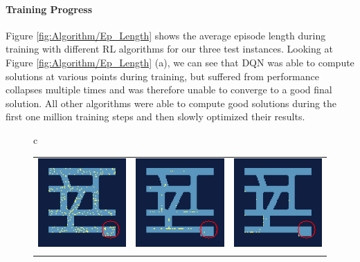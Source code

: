 \paragraph{Training Progress}
Figure \ref{fig:Algorithm/Ep_Length} shows the average episode length during training with different RL algorithms for our three test instances. Looking at Figure \ref{fig:Algorithm/Ep_Length} (a), we can see that DQN was able to compute solutions at various points during training, but suffered from performance collapses multiple times and was therefore unable to converge to a good final solution. All other algorithms were able to compute good solutions during the first one million training steps and then slowly optimized their results. 

\begin{figure} [htp]
    \begin{center}
        \begin{tabular}{c}
            \begin{tabular}{ccc}
                \includegraphics[width=0.26\columnwidth]{figures/evaluation/algorithms/training_example/acktr/0_k.png} & 
                \includegraphics[width=0.26\columnwidth]{figures/evaluation/algorithms/training_example/acktr/6_k.png} & 
                \includegraphics[width=0.26\columnwidth]{figures/evaluation/algorithms/training_example/acktr/12_k.png} \\
                \addlinespace[0.2cm]

\end{tabular}
\end{tabular}
\end{center}
\end{figure}
